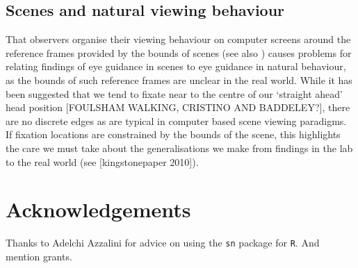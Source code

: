 \documentclass[a4paper, onecolumn, oneside, 11pt]{article}
\begin{document}
\subsection{Scenes and natural viewing behaviour}
That observers organise their viewing behaviour on computer screens around the reference frames provided by the bounds of scenes (see also \cite{Stainer:2013ce}) causes problems for relating findings of eye guidance in scenes to eye guidance in natural behaviour, as the bounds of such reference frames are unclear in the real world. While it has been suggested that we tend to fixate near to the centre of our `straight ahead' head position [FOULSHAM WALKING, CRISTINO AND BADDELEY?], there are no discrete edges as are typical in computer based scene viewing paradigms. If fixation locations are constrained by the bounds of the scene, this highlights the care we must take about the generalisations we make from findings in the lab to the real world (see [kingstonepaper 2010]). 






\section*{Acknowledgements}

Thanks to Adelchi Azzalini for advice on using the \texttt{sn} package for \texttt{R}. And mention grants. 


\small

\end{document}
